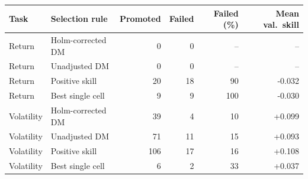 \begin{tabular}{llrrrr}
\toprule
Task & Selection rule & Promoted & Failed & Failed (\%) & Mean val.\ skill \\
\midrule
Return & Holm-corrected DM & 0 & 0 & -- & -- \\
Return & Unadjusted DM & 0 & 0 & -- & -- \\
Return & Positive skill & 20 & 18 & 90 & -0.032 \\
Return & Best single cell & 9 & 9 & 100 & -0.030 \\
\midrule
Volatility & Holm-corrected DM & 39 & 4 & 10 & +0.099 \\
Volatility & Unadjusted DM & 71 & 11 & 15 & +0.093 \\
Volatility & Positive skill & 106 & 17 & 16 & +0.108 \\
Volatility & Best single cell & 6 & 2 & 33 & +0.037 \\
\bottomrule
\end{tabular}
